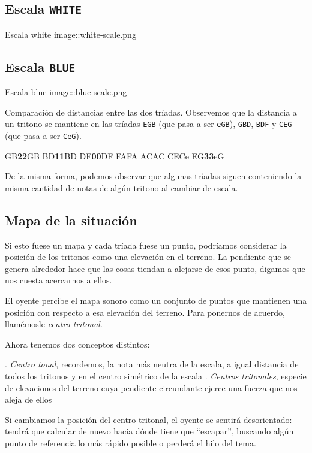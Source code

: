 \documentclass[]{article}
\begin{document}
\subsection{Escala \texttt{WHITE} }

Escala white image::white-scale.png

\subsection{Escala \texttt{BLUE} }

Escala blue image::blue-scale.png

Comparación de distancias entre las dos tríadas. Observemos que la distancia a un tritono se mantiene en las tríadas \texttt{EGB} (que pasa a ser \texttt{eGB}), \texttt{GBD}, \texttt{BDF} y \texttt{CEG} (que pasa a ser \texttt{CeG}).

GB\textbf{2}\textbf{2}GB BD\textbf{1}\textbf{1}BD DF\textbf{0}\textbf{0}DF FAFA ACAC CECe EG\textbf{3}\textbf{3}eG

De la misma forma, podemos observar que algunas tríadas siguen conteniendo la misma cantidad de notas de algún tritono al cambiar de escala.

\subsection{Mapa de la situación}

Si esto fuese un mapa y cada tríada fuese un punto, podríamos considerar la posición de los tritonos como una elevación en el terreno. La pendiente que se genera alrededor hace que las cosas tiendan a alejarse de esos punto, digamos que nos cuesta acercarnos a ellos.

El oyente percibe el mapa sonoro como un conjunto de puntos que mantienen una posición con respecto a esa elevación del terreno. Para ponernos de acuerdo, llamémosle \emph{centro tritonal}.

Ahora tenemos dos conceptos distintos:

. \emph{Centro tonal}, recordemos, la nota más neutra de la escala, a igual distancia de todos los tritonos y en el centro simétrico de la escala . \emph{Centros tritonales}, especie de elevaciones del terreno cuya pendiente circundante ejerce una fuerza que nos aleja de ellos

Si cambiamos la posición del centro tritonal, el oyente se sentirá desorientado: tendrá que calcular de nuevo hacia dónde tiene que ``escapar'', buscando algún punto de referencia lo más rápido posible o perderá el hilo del tema.
\end{document}
